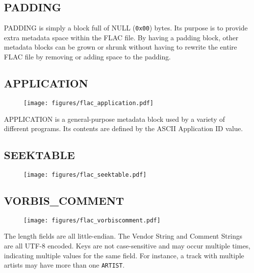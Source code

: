 \subsection{PADDING}

PADDING is simply a block full of NULL (\texttt{0x00}) bytes.
Its purpose is to provide extra metadata space within the FLAC file.
By having a padding block, other metadata blocks can be grown or
shrunk without having to rewrite the entire FLAC file by removing or
adding space to the padding.


\subsection{APPLICATION}
\begin{figure}[h]
\texttt{[image: figures/flac\_application.pdf]}
\end{figure}
\noindent
APPLICATION is a general-purpose metadata block used by a variety of
different programs.
Its contents are defined by the ASCII Application ID value.

\subsection{SEEKTABLE}
\begin{figure}[h]
\texttt{[image: figures/flac\_seektable.pdf]}
\end{figure}

\pagebreak

\subsection{VORBIS\_COMMENT}
\begin{figure}[h]
\texttt{[image: figures/flac\_vorbiscomment.pdf]}
\end{figure}
\par
\noindent
The length fields are all little-endian.
The Vendor String and Comment Strings are all UTF-8 encoded.
Keys are not case-sensitive and may occur multiple times,
indicating multiple values for the same field.
For instance, a track with multiple artists may have
more than one \texttt{ARTIST}.

